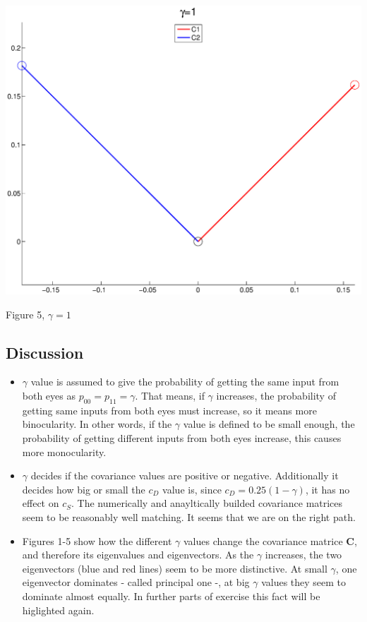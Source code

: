 \documentclass{article}
\begin{document}
\begin{center}
\includegraphics[width=\textwidth]{eigen5.eps}
\begin{footnotesize}
 Figure 5, $\gamma=1$
\end{footnotesize}
\end{center}

\subsection{Discussion}
\begin{itemize}
 \item $\gamma$ value is assumed to give the probability of getting the same input from both eyes as $p_{00}=p_{11}=\gamma$. That means, if $\gamma$ increases, the probability of getting same inputs from both eyes must increase, so it means more binocularity. In other words, if the $\gamma$ value is defined to be small enough, the probability of getting different inputs from both eyes increase, this causes more monocularity. 

\item $\gamma$ decides if the covariance values are positive or negative. Additionally it decides how big or small the $c_D$ value is, since $c_D=0.25(1-\gamma)$, it has no effect on $c_S$. The numerically and anayltically builded covariance matrices seem to be reasonably well matching. It seems that we are on the right path.

\item Figures 1-5 show how the different $\gamma$ values change the covariance matrice \textbf{C}, and therefore its eigenvalues and eigenvectors. As the $\gamma$ increases, the two eigenvectors (blue and red lines) seem to be more distinctive. At small $\gamma$, one eigenvector dominates - called principal one -, at big $\gamma$ values they seem to dominate almost equally. In further parts of exercise this fact will be higlighted again. 
\end{itemize}
\end{document}
